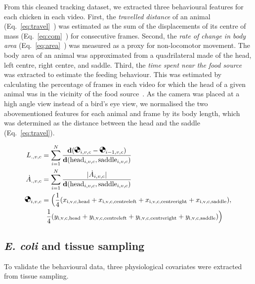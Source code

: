 From this cleaned tracking dataset, we extracted three behavioural features for each chicken in each video. First, the \emph{travelled distance} of an animal (Eq.~\ref{eq:travel}~\cite{scheidwasser2025c}) was estimated as the sum of the displacements of its centre of mass (Eq.~\ref{eq:com}~\cite{scheidwasser2025c}) for consecutive frames. Second, the \emph{rate of change in body area} (Eq.~\ref{eq:area}~\cite{scheidwasser2025c}) was measured as a proxy for non-locomotor movement. The body area of an animal was approximated from a quadrilateral made of the head, left centre, right centre, and saddle. Third, the \emph{time spent near the food source} was extracted to estimate the feeding behaviour. This was estimated by calculating the percentage of frames in each video for which the head of a given animal was in the vicinity of the food source~\cite{scheidwasser2025c}. As the camera was placed at a high angle view instead of a bird's eye view, we normalised the two abovementioned features for each animal and frame by its body length, which was determined as the distance between the head and the saddle (Eq.~\ref{eq:travel}). 

\begin{align}
    L_{.,v,c} &= \sum_{i=1}^{N} \frac{\mathbf{d}(\centerofmass_{i,v,c} - \centerofmass_{i-1,v,c})}{\mathbf{d}(\text{head}_{i,v,c}, \text{saddle}_{i,v,c})} \label{eq:travel} \\
    \dot{A}_{.,v,c} &= \sum_{i=1}^{N} \frac{|\dot{A}_{i,v,c}|}{\mathbf{d}(\text{head}_{i,v,c}, \text{saddle}_{i,v,c})} \label{eq:area} \\
    \centerofmass_{i,v,c} &= \Big(\frac{1}{4}(x_{\text{i,v,c,head}} + x_{\text{i,v,c,centreleft}} + x_{\text{i,v,c,centreright}} + x_{\text{i,v,c,saddle}}),\notag\\ 
    &~~\frac{1}{4}(y_{\text{i,v,c,head}} + y_{\text{i,v,c,centreleft}} + y_{\text{i,v,c,centreright}} + y_{\text{i,v,c,saddle}})\Big)
    \label{eq:com}
\end{align}

\subsection{\textit{E. coli} and tissue sampling}
\label{methods:chicken_physio}

To validate the behavioural data, three physiological covariates were extracted from tissue sampling.


